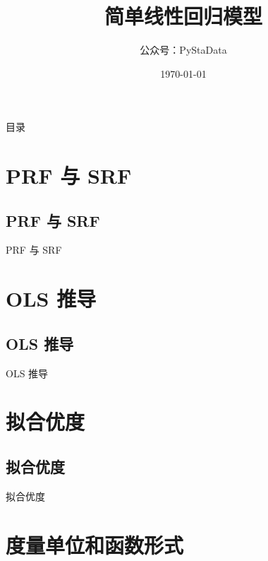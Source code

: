 \documentclass[UTF8]{ctexbeamer}
\begin{document}
\title{简单线性回归模型}
\author{公众号：PyStaData}
\date{\today}

\frame{\titlepage} %


\begin{frame}{目录}
\begin{multicols}{2}
  \tableofcontents
\end{multicols}
\end{frame}



\section{PRF 与 SRF  }
\subsection{PRF 与 SRF}
\begin{frame}{PRF 与 SRF}
\end{frame}

\section{OLS 推导 }
\subsection{OLS 推导}
\begin{frame}{OLS 推导}
\end{frame}


\section{拟合优度}
\subsection{拟合优度}
\begin{frame}{拟合优度}
\end{frame}

\section{度量单位和函数形式}
\end{document}
